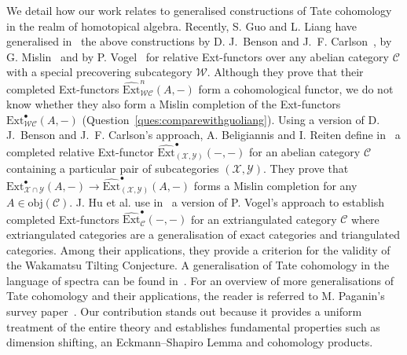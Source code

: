 \documentclass[12pt,a4paper]{article}
\numberwithin{equation}{section}
\theoremstyle{nonumberplain}
\begin{document}
We detail how our work relates to generalised constructions of Tate cohomology in the realm of homotopical algebra. Recently, S. Guo and L. Liang have generalised in~\cite{guo23} the above constructions by D.\! J.\ Benson and J.\ F.\! Carlson~\cite{ben92}, by G.\! Mislin~\cite{mis94} and by P.\! Vogel~\cite{goi92} for relative Ext-functors over any abelian category $\mathcal{C}$ with a special precovering subcategory $\mathcal{W}$. Although they prove that their completed Ext-functors $\widehat{\mathrm{Ext}}_{\mathcal{WC}}^n(A, -)$ form a cohomological functor, we do not know whether they also form a Mislin completion of the Ext-functors $\mathrm{Ext}_{\mathcal{WC}}^{\bullet}(A, -)$ (Question~\ref{ques:comparewithguoliang}). Using a version of D.\! J.\ Benson and J.\ F.\! Carlson's approach, A.\! Beligiannis and I.\! Reiten define in~\cite[Section~IX.2]{bel07} a completed relative Ext-functor $\widehat{\mathrm{Ext}}_{(\mathcal{X}, \mathcal{Y})}^{\bullet}(-, -)$ for an abelian category $\mathcal{C}$ containing a particular pair of subcategories $(\mathcal{X}, \mathcal{Y})$. They prove that $\mathrm{Ext}_{\mathcal{X} \cap \mathcal{Y}}^{\bullet}(A, -) \rightarrow \widehat{\mathrm{Ext}}_{(\mathcal{X}, \mathcal{Y})}^{\bullet}(A, -)$ forms a Mislin completion for any $A \in \mathrm{obj}(\mathcal{C})$. J.\! Hu et al.\! use in~\cite{hu21} a version of P.\! Vogel's approach to establish completed Ext-functors $\widehat{\mathrm{Ext}}_{\mathcal{C}}^{\bullet}(-, -)$ for an extriangulated category $\mathcal{C}$ where extriangulated categories are a generalisation of exact categories and triangulated categories. Among their applications, they provide a criterion for the validity of the Wakamatsu Tilting Conjecture. A generalisation of Tate cohomology in the language of spectra can be found in~\cite{kle02}. For an overview of more generalisations of Tate cohomology and their applications, the reader is referred to M.\! Paganin's survey paper~\cite{pag16}. Our contribution stands out because it provides a uniform treatment of the entire theory and establishes fundamental properties such as dimension shifting, an Eckmann–Shapiro Lemma and cohomology products. \\
\end{document}
